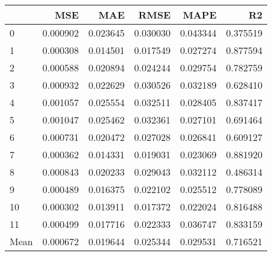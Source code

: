 \begin{tabular}{lrrrrr}
\toprule
 & MSE & MAE & RMSE & MAPE & R2 \\
\midrule
0 & 0.000902 & 0.023645 & 0.030030 & 0.043344 & 0.375519 \\
1 & 0.000308 & 0.014501 & 0.017549 & 0.027274 & 0.877594 \\
2 & 0.000588 & 0.020894 & 0.024244 & 0.029754 & 0.782759 \\
3 & 0.000932 & 0.022629 & 0.030526 & 0.032189 & 0.628410 \\
4 & 0.001057 & 0.025554 & 0.032511 & 0.028405 & 0.837417 \\
5 & 0.001047 & 0.025462 & 0.032361 & 0.027101 & 0.691464 \\
6 & 0.000731 & 0.020472 & 0.027028 & 0.026841 & 0.609127 \\
7 & 0.000362 & 0.014331 & 0.019031 & 0.023069 & 0.881920 \\
8 & 0.000843 & 0.020233 & 0.029043 & 0.032112 & 0.486314 \\
9 & 0.000489 & 0.016375 & 0.022102 & 0.025512 & 0.778089 \\
10 & 0.000302 & 0.013911 & 0.017372 & 0.022024 & 0.816488 \\
11 & 0.000499 & 0.017716 & 0.022333 & 0.036747 & 0.833159 \\
Mean & 0.000672 & 0.019644 & 0.025344 & 0.029531 & 0.716521 \\
\bottomrule
\end{tabular}
